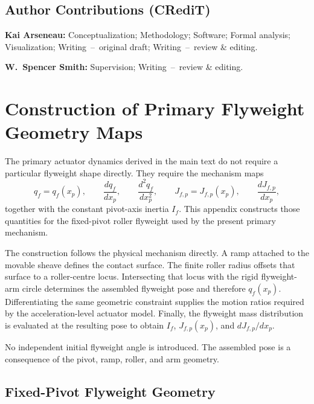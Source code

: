 \documentclass[11pt]{report}
\numberwithin{equation}{section}
\begin{document}
\section*{Author Contributions (CRediT)}

\noindent\textbf{Kai Arseneau:} Conceptualization; Methodology; Software;
Formal analysis; Visualization; Writing~--~original draft;
Writing~--~review \& editing.

\noindent\textbf{W.~Spencer Smith:} Supervision;
Writing~--~review \& editing.




\appendix

\chapter{Construction of Primary Flyweight Geometry Maps}
\label{app:primary_flyweight_geometry}

The primary actuator dynamics derived in the main text do not require a particular
flyweight shape directly. They require the mechanism maps
\begin{equation}
    q_f=q_f(x_p),
    \qquad
    \frac{dq_f}{dx_p},
    \qquad
    \frac{d^2q_f}{dx_p^2},
    \qquad
    J_{f,p}=J_{f,p}(x_p),
    \qquad
    \frac{dJ_{f,p}}{dx_p},
    \label{eq:appB_required_maps}
\end{equation}
together with the constant pivot-axis inertia \(I_f\). This appendix constructs
those quantities for the fixed-pivot roller flyweight used by the present
primary mechanism.

The construction follows the physical mechanism directly. A ramp attached to
the movable sheave defines the contact surface. The finite roller radius offsets
that surface to a roller-centre locus. Intersecting that locus with the rigid
flyweight-arm circle determines the assembled flyweight pose and therefore
\(q_f(x_p)\). Differentiating the same geometric constraint supplies the motion
ratios required by the acceleration-level actuator model. Finally, the
flyweight mass distribution is evaluated at the resulting pose to obtain
\(I_f\), \(J_{f,p}(x_p)\), and \(dJ_{f,p}/dx_p\).

No independent initial flyweight angle is introduced. The assembled pose is a
consequence of the pivot, ramp, roller, and arm geometry.

\section{Fixed-Pivot Flyweight Geometry}
\label{app:flyweight_pivoted_roller}
\label{sec:primary_flyweight_geometry_examples}
\end{document}
